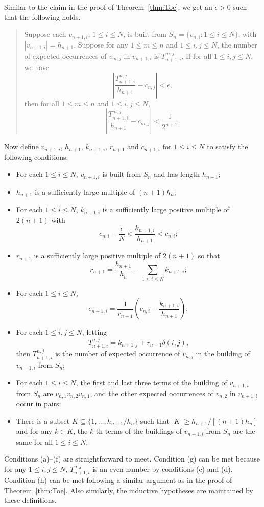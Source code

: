 \documentclass{amsart}
\theoremstyle{definition}
\theoremstyle{problem}
\theoremstyle{remark}
\numberwithin{equation}{section}
\begin{document}

Similar to the claim in the proof of Theorem~\ref{thm:Toe}, we get an $\epsilon>0$ such that the following holds. 
\begin{quote}
Suppose each $v_{n+1,i}$, $1\leq i\leq N$, is built from $S_n=\{v_{n,i}\colon 1\leq i\leq N\}$, with $|v_{n+1, i}|=h_{n+1}$. Suppose for any $1\leq m\leq n$ and $1\leq i,j\leq N$, the number of expected occurrences of $v_{m,j}$ in $v_{n+1,i}$ is $T^{m,j}_{n+1,i}$. If for all $1\leq i,j\leq N$, we have
$$ \left|\displaystyle\frac{T^{n,j}_{n+1,i}}{h_{n+1}}-c_{n,j}\right|<\epsilon, $$
then for all $1\leq m\leq n$ and $1\leq i,j\leq N$,
$$ \left|\displaystyle\frac{T^{m,j}_{n+1,i}}{h_{n+1}}-c_{m,j}\right|<\displaystyle\frac{1}{2^{n+1}}. $$
\end{quote}

Now define $v_{n+1,i}$, $h_{n+1}$, $k_{n+1,i}$, $r_{n+1}$ and $c_{n+1,i}$ for $1\leq i\leq N$ to satisfy the following conditions:
\begin{itemize}
\item[(a)] For each $1\leq i\leq N$, $v_{n+1,i}$ is built from $S_n$ and has length $h_{n+1}$;
\item[(b)] $h_{n+1}$ is a sufficiently large multiple of $(n+1)h_n$;
\item[(c)] For each $1\leq i\leq N$, $k_{n+1,i}$ is a sufficiently large positive multiple of $2(n+1)$ with 
$$ c_{n,i}-\displaystyle\frac{\epsilon}{N}<\displaystyle\frac{k_{n+1,i}}{h_{n+1}}<c_{n,i};$$
\item[(d)] $r_{n+1}$ is a sufficiently large positive multiple of $2(n+1)$ so that
$$ r_{n+1}=\displaystyle\frac{h_{n+1}}{h_n}-\displaystyle\sum_{1\leq i\leq N} k_{n+1, i}; $$
\item[(e)] For each $1\leq i\leq N$,
$$c_{n+1,i}=\displaystyle\frac{1}{r_{n+1}} \left(c_{n,i}-\displaystyle\frac{k_{n+1,i}}{h_{n+1}}\right); $$ 
\item[(f)] For each $1\leq i,j\leq N$, letting
 $$ T^{n,j}_{n+1,i}=k_{n+1,j}+r_{n+1}\delta(i,j), $$ 
then $T^{n,j}_{n+1,i}$ is the number of expected occurrence of $v_{n,j}$ in the building of $v_{n+1,i}$ from $S_n$;
\item[(g)] For each $1\leq i\leq N$, the first and last three terms of the building of $v_{n+1,i}$ from $S_n$ are $v_{n,1}v_{n,2}v_{n,1}$, and the other expected occurrences of $v_{n,2}$ in $v_{n+1,i}$ occur in pairs;
\item[(h)] There is a subset $K\subseteq\{1,\dots, h_{n+1}/h_n\}$ such that $|K|\geq h_{n+1}/[(n+1)h_n]$ and for any $k\in K$, the $k$-th terms of the buildings of $v_{n+1,i}$ from $S_n$ are the same for all $1\leq i\leq N$.
\end{itemize}
Conditions (a)--(f) are straightforward to meet. Condition (g) can be met because for any $1\leq i,j\leq N$, $T^{n,j}_{n+1,i}$ is an even number by conditions (c) and (d). Condition (h) can be met following a similar argument as in the proof of Theorem~\ref{thm:Toe}. Also similarly, the inductive hypotheses are maintained by these definitions. 
\end{document}
